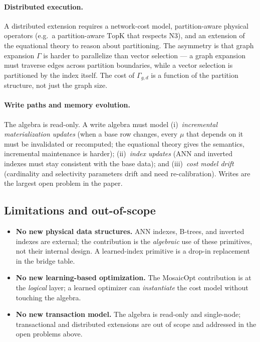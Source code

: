 \documentclass[acmsmall,review,anonymous]{acmart}
\theoremstyle{plain}
\theoremstyle{definition}
\theoremstyle{remark}
\begin{document}
\paragraph{Distributed execution.}\label{sec:open:distributed}
A distributed extension requires a network-cost model, partition-aware
physical operators (e.g.\ a partition-aware $\mathrm{TopK}$ that
respects N3), and an extension of the equational theory to reason
about partitioning. The asymmetry is that graph expansion $\Gamma$ is
harder to parallelize than vector selection --- a graph expansion must
traverse edges across partition boundaries, while a vector selection
is partitioned by the index itself. The cost of $\Gamma_{g,d}$ is a
function of the partition structure, not just the graph size.

\paragraph{Write paths and memory evolution.}\label{sec:open:write}
The algebra is read-only. A write algebra must model
(i)~\emph{incremental materialization updates} (when a base row
changes, every $\mu$ that depends on it must be invalidated or
recomputed; the equational theory gives the semantics,
incremental maintenance is harder);
(ii)~\emph{index updates} (ANN and inverted indexes must stay
consistent with the base data); and
(iii)~\emph{cost model drift} (cardinality and selectivity
parameters drift and need re-calibration). Writes are the
largest open problem in the paper.

\subsection{Limitations and out-of-scope}

\begin{itemize}[leftmargin=*]
  \item \textbf{No new physical data structures.} ANN indexes,
    B-trees, and inverted indexes are external; the contribution is
    the \emph{algebraic} use of these primitives, not their internal
    design. A learned-index primitive \cite{kraska2018} is a drop-in
    replacement in the bridge table.
  \item \textbf{No new learning-based optimization.} The
    MosaicOpt contribution is at the \emph{logical} layer; a learned
    optimizer can \emph{instantiate} the cost model without touching
    the algebra.
  \item \textbf{No new transaction model.} The algebra is read-only
    and single-node; transactional and distributed extensions are
    out of scope and addressed in the open problems above.
\end{itemize}
\end{document}
